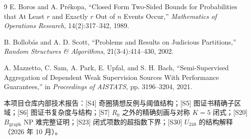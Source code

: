 \documentclass[11pt,a4paper]{article}
\theoremstyle{definition}
\theoremstyle{remark}
\begin{document}
\begin{thebibliography}{9}
E. Boros and A. Pr\'{e}kopa, ``Closed Form Two-Sided Bounds for Probabilities that At Least $r$ and Exactly $r$ Out of $n$ Events Occur,'' \emph{Mathematics of Operations Research}, 14(2):317--342, 1989.

B. Bollob\'{a}s and A. D. Scott, ``Problems and Results on Judicious Partitions,'' \emph{Random Structures \& Algorithms}, 21(3-4):414--430, 2002.

A. Mazzetto, C. Sam, A. Park, E. Upfal, and S. H. Bach, ``Semi-Supervised Aggregation of Dependent Weak Supervision Sources With Performance Guarantees,'' in \emph{Proceedings of AISTATS}, pp. 3196--3204, 2021.

本项目仓库内部技术报告：[S4] 奇圈猜想反例与阈值结构；[S5] 图证书精确子区域；[S6] 图证书复杂度与结构；[S7] $R_0$ 之外的精确刻画与对称 $K=5$ 闭式；[S20] $B_{\mathrm{graph}}$ NP 难完整证明；[S23] 闭式项数的超指数下界；[S30] $U_{248}$ 的结构解释（2026 年 10 月）。
\end{thebibliography}
\end{document}
